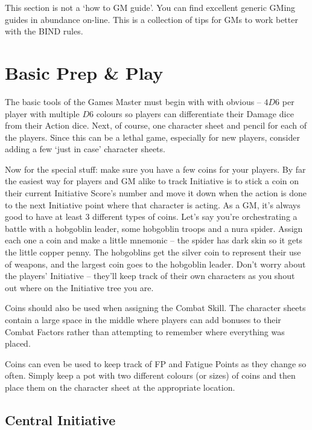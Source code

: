
This section is not a `how to GM guide'.  You can find excellent generic GMing guides in abundance on-line.  This is a collection of tips for GMs to work better with the BIND rules.

\section{Basic Prep \& Play}

\begin{multicols}{2}

The basic tools of the Games Master must begin with with obvious -- $4D6$ per player with multiple $D6$ colours so players can differentiate their Damage dice from their Action dice.  Next, of course, one character sheet and pencil for each of the players.  Since this can be a lethal game, especially for new players, consider adding a few `just in case' character sheets.

Now for the special stuff: make sure you have a few coins for your players.  By far the easiest way for players and GM alike to track Initiative is to stick a coin on their current Initiative Score's number and move it down when the action is done to the next Initiative point where that character is acting.  As a GM, it's always good to have at least 3 different types of coins.  Let's say you're orchestrating a battle with a hobgoblin leader, some hobgoblin troops and a nura spider. Assign each one a coin and make a little mnemonic -- the spider has dark skin so it gets the little copper penny.  The hobgoblins get the silver coin to represent their use of weapons, and the largest coin goes to the hobgoblin leader.  Don't worry about the players' Initiative -- they'll keep track of their own characters as you shout out where on the Initiative tree you are.

Coins should also be used when assigning the Combat Skill.  The character sheets contain a large space in the middle where players can add bonuses to their Combat Factors rather than attempting to remember where everything was placed.

Coins can even be used to keep track of FP and Fatigue Points as they change so often.  Simply keep a pot with two different colours (or sizes) of coins and then place them on the character sheet at the appropriate location.

\subsection{Central Initiative}


\end{multicols}

